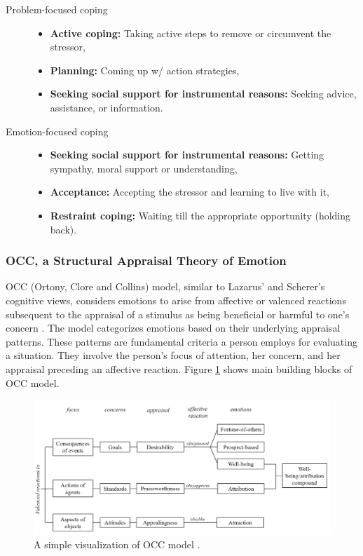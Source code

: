 \documentclass[11pt]{article}
\begin{document}
\begin{description}
  \item[Problem-focused coping] \hfill
	\begin{itemize}
	  \item \textbf{Active coping:} Taking active steps to remove or circumvent the
	  stressor,
	  \item \textbf{Planning:} Coming up w/ action strategies,
	  \item \textbf{Seeking social support for instrumental reasons:} Seeking
	  advice, assistance, or information.
	\end{itemize}
  \item[Emotion-focused coping] \hfill
    \begin{itemize}
	  \item \textbf{Seeking social support for instrumental reasons:} Getting
	  sympathy, moral support or understanding,
	  \item \textbf{Acceptance:} Accepting the stressor and learning to live with
	  it,
	  \item \textbf{Restraint coping:} Waiting till the appropriate opportunity
	  (holding back).
	\end{itemize}
\end{description}

\subsubsection{OCC, a Structural Appraisal Theory of Emotion}

OCC (Ortony, Clore and Collins) model, similar to Lazarus'
\cite{lazarus:cognitive-theory-emotion} and Scherer's
\cite{scherer:nature-function-emotion} cognitive views, considers emotions to
arise from affective or valenced reactions subsequent to the appraisal of a
stimulus as being beneficial or harmful to one’s concern \cite{occ:structure}.
The model categorizes emotions based on their underlying appraisal patterns.
These patterns are fundamental criteria a person employs for evaluating a
situation. They involve the person's focus of attention, her concern, and
her appraisal preceding an affective reaction. Figure \ref{fig:occ-model} shows
main building blocks of OCC model.

\begin{figure}[tbh]
  \center
  \includegraphics[width=\textwidth]{figure/occ.png}
  \caption{A simple visualization of OCC model \cite{occ:structure}.}
  \label{fig:occ-model}
\end{figure}
\end{document}
